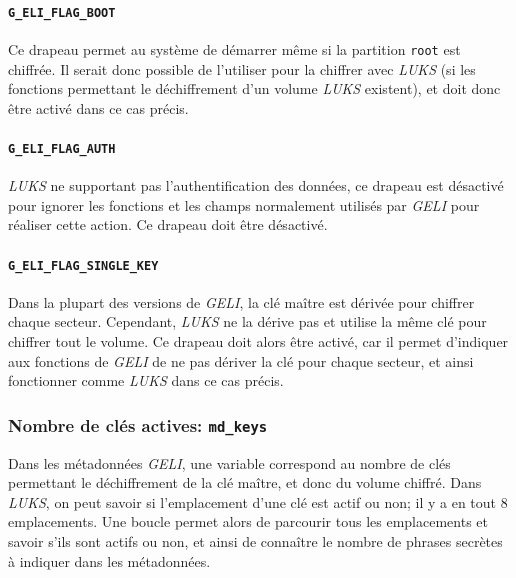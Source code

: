 \paragraph{\texttt{G\_ELI\_FLAG\_BOOT}}
Ce drapeau permet au système de démarrer même si la partition \texttt{root} est
chiffrée. Il serait donc possible de l'utiliser pour la chiffrer avec
\textit{LUKS} (si les fonctions permettant le déchiffrement d'un volume
\textit{LUKS} existent), et doit donc être activé dans ce cas précis.
\paragraph{\texttt{G\_ELI\_FLAG\_AUTH}}
\textit{LUKS} ne supportant pas l'authentification des données, ce drapeau est
désactivé pour ignorer les fonctions et les champs normalement utilisés par
\textit{GELI} pour réaliser cette action. Ce drapeau doit être désactivé.
\paragraph{\texttt{G\_ELI\_FLAG\_SINGLE\_KEY}}
Dans la plupart des versions de \textit{GELI}, la clé maître est dérivée pour
chiffrer chaque secteur. Cependant, \textit{LUKS} ne la dérive pas et utilise la
même clé pour chiffrer tout le volume. Ce drapeau doit alors être activé, car
il permet d'indiquer aux fonctions de \textit{GELI} de ne pas dériver la clé
pour chaque secteur, et ainsi fonctionner comme \textit{LUKS} dans ce cas
précis.

\subsubsection{Nombre de clés actives: \texttt{md\_keys}}
Dans les métadonnées \textit{GELI}, une variable correspond au nombre de clés
permettant le déchiffrement de la clé maître, et donc du volume chiffré. Dans
\textit{LUKS}, on peut savoir si l'emplacement d'une clé est actif ou non; il y
a en tout 8 emplacements. Une boucle permet alors de parcourir tous les
emplacements et savoir s'ils sont actifs ou non, et ainsi de connaître le nombre
de phrases secrètes à indiquer dans les métadonnées.

